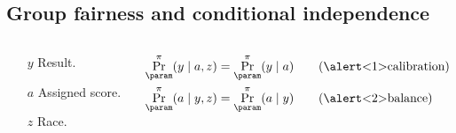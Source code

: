 \subsection{Group fairness and conditional independence}
\begin{frame}
  \begin{columns}
    \begin{column}{0.3\textwidth}
      \begin{itemize}
      \item[$y$] Result.
      \item[$a$] Assigned score.
      \item[$z$] Race.
      \end{itemize}
    \end{column}
    \begin{column}{0.7\textwidth}
      \begin{align}
        \Pr_\param^\pi(y \mid a, z) &= \Pr_\param^\pi(y \mid a) \tag{\alert<1>{calibration}}\\
        \Pr_\param^{\pi}(a \mid y, z) &= \Pr_\param^{\pi}(a \mid y) \tag{\alert<2>{balance}}

\end{align}
\end{column}
\end{columns}
\end{frame}
